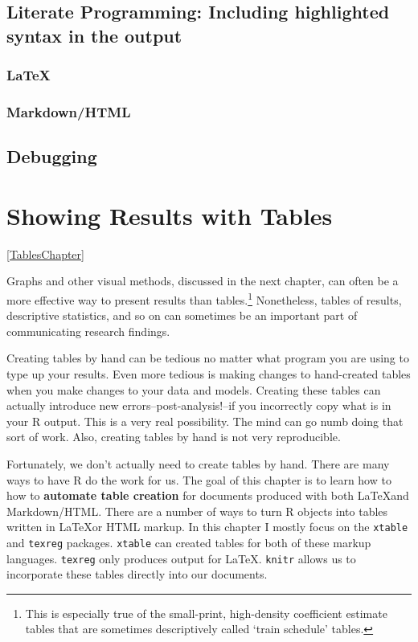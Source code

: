 \documentclass[ChapterTOCs,krantz1]{krantz}\usepackage{graphicx, color}
\begin{document}
\section{Literate Programming: Including highlighted syntax in the output}

\subsection{\LaTeX}

\subsection{Markdown/HTML}

\section{Debugging}





\chapter{Showing Results with Tables}\ref{TablesChapter}

Graphs and other visual methods, discussed in the next chapter, can
often be a more effective way to present results than tables.\footnote{This
  is especially true of the small-print, high-density coefficient
  estimate tables that are sometimes descriptively called `train
  schedule' tables.} Nonetheless, tables of results, descriptive statistics,
and so on can sometimes be an important part of communicating
research findings.

Creating tables by hand can be tedious no matter what program you are
using to type up your results. Even more tedious is making changes to
hand-created tables when you make changes to your data and models.
Creating these tables can actually introduce new
errors--post-analysis!--if you incorrectly copy what is in your
R output. This is a very real possibility. The mind can go numb
doing that sort of work. Also, creating tables by hand is not very
reproducible.

Fortunately, we don't actually need to create tables by hand. There are
many ways to have R do the work for us. The goal of this
chapter is to learn how to how to \textbf{automate table creation} for
documents produced with both \LaTeX and Markdown/HTML. There are a
number of ways to turn R objects into tables written in
\LaTeX or HTML markup. In this chapter I mostly focus on the
\texttt{xtable} and \texttt{texreg} packages. \texttt{xtable} can
created tables for both of these markup languages. \texttt{texreg} only
produces output for \LaTeX. \texttt{knitr} allows us to incorporate
these tables directly into our documents.
\end{document}
